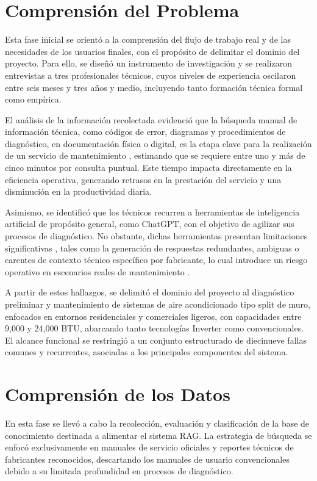 {{\section{Comprensión del Problema}

Esta fase inicial se orientó a la comprensión del flujo de trabajo real y de las necesidades de los usuarios finales, con el propósito de delimitar el dominio del proyecto. Para ello, se diseñó un instrumento de investigación y se realizaron entrevistas a tres profesionales técnicos, cuyos niveles de experiencia oscilaron entre seis meses y tres años y medio, incluyendo tanto formación técnica formal como empírica.

El análisis de la información recolectada evidenció que la búsqueda manual de información técnica, como códigos de error, diagramas y procedimientos de diagnóstico, en documentación física o digital, es la etapa clave para la realización de un servicio de mantenimiento \parencite{krutli2025augmenting}, estimando que se requiere entre uno y más de cinco minutos por consulta puntual. Este tiempo impacta directamente en la eficiencia operativa, generando retrasos en la prestación del servicio y una disminución en la productividad diaria.

Asimismo, se identificó que los técnicos recurren a herramientas de inteligencia artificial de propósito general, como ChatGPT, con el objetivo de agilizar sus procesos de diagnóstico. No obstante, dichas herramientas presentan limitaciones significativas \parencite{anhhoang2025survey}, tales como la generación de respuestas redundantes, ambiguas o carentes de contexto técnico específico por fabricante, lo cual introduce un riesgo operativo en escenarios reales de mantenimiento .

A partir de estos hallazgos, se delimitó el dominio del proyecto al diagnóstico preliminar y mantenimiento de sistemas de aire acondicionado tipo split de muro, enfocados en entornos residenciales y comerciales ligeros, con capacidades entre 9,000 y 24,000 BTU, abarcando tanto tecnologías Inverter como convencionales. El alcance funcional se restringió a un conjunto estructurado de diecinueve fallas comunes y recurrentes, asociadas a los principales componentes del sistema.

\section{Comprensión de los Datos}

En esta fase se llevó a cabo la recolección, evaluación y clasificación de la base de conocimiento destinada a alimentar el sistema RAG. La estrategia de búsqueda se enfocó exclusivamente en manuales de servicio oficiales y reportes técnicos de fabricantes reconocidos, descartando los manuales de usuario convencionales debido a su limitada profundidad en procesos de diagnóstico.

}}
